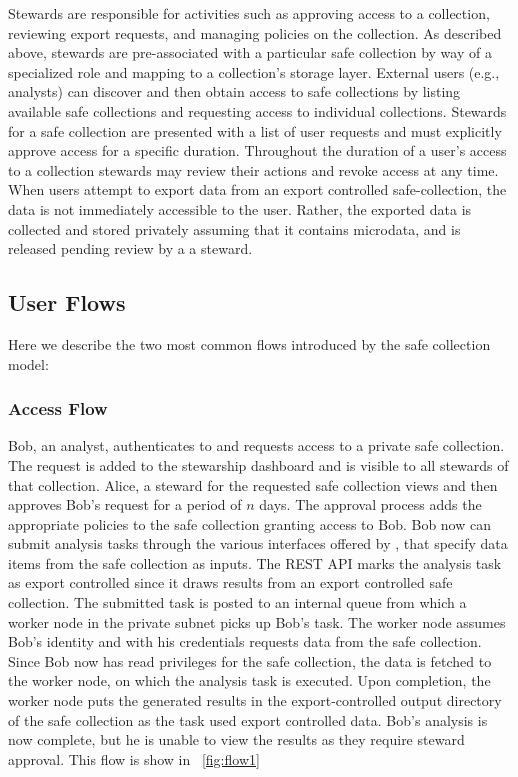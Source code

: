 Stewards are responsible for activities such as approving access to a collection, reviewing
export requests, and managing policies on the collection.
As described above, stewards are pre-associated with a particular safe collection by
way of a specialized role and mapping to a collection's storage layer.
External users (e.g., analysts) can discover
and then obtain access to safe collections by listing available safe collections and requesting
access to individual collections.
Stewards for a safe collection are presented with a list of user requests and must explicitly approve access
for a specific duration. Throughout the duration of a user's access to a collection
stewards may review their actions and revoke access at any time. When users attempt
to export data from an export controlled safe-collection, the data is not immediately
accessible to the user. Rather, the exported data is collected and stored privately
assuming that it contains microdata, and is released pending review by a a steward.


\subsection{User Flows}

Here we describe the two most common flows introduced by the safe collection model:

\subsubsection{Access Flow}

Bob, an analyst, authenticates to \NAME and requests access to a private safe collection.
The request is added to the stewarship dashboard and is visible to all stewards
of that collection. Alice, a steward for the requested
safe collection views and then approves Bob's request for a period of $n$ days.
The approval process adds the appropriate policies to the
safe collection granting access to Bob. Bob now can submit analysis tasks through the various
interfaces offered by \NAME, that specify data items from the safe collection as inputs.
The REST API marks the analysis task as export controlled since it draws results
from an export controlled safe collection.
The submitted task is posted to an internal queue from which a
worker node in the \NAME private subnet picks up Bob's task. The worker node assumes Bob's identity and with
his credentials requests data from the safe collection. Since Bob now has read privileges for the
safe collection, the data is fetched to the worker node, on which the analysis task is executed.
Upon completion, the worker node puts the generated results in the export-controlled
output directory of the safe collection as the task used export controlled data.
Bob's analysis is now complete, but he is unable to view the
results as they require steward approval. This flow is show in \figurename~\ref{fig:flow1}

